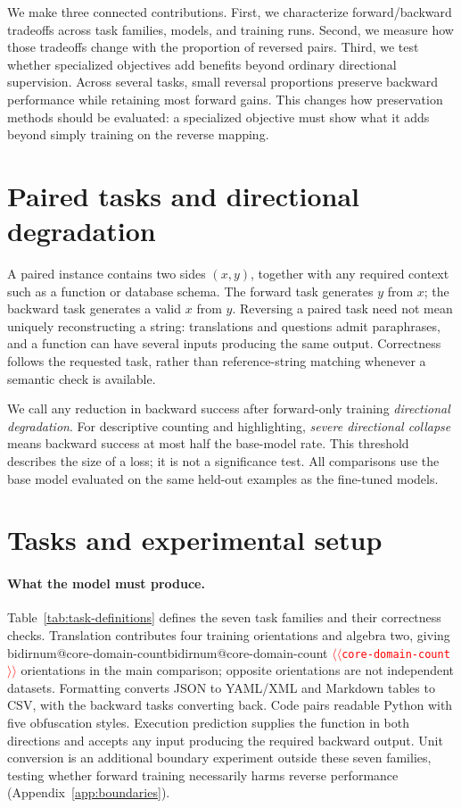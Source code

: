 \documentclass[11pt]{article}
\makeatletter
\providecommand{\NUM}[1]{%
  \ifcsname bidirnum@#1\endcsname\csname bidirnum@#1\endcsname
  \else\textcolor{red}{$\langle\langle$\texttt{#1}$\rangle\rangle$}\fi}
\makeatother
\begin{document}
We make three connected contributions. First, we characterize forward/backward
tradeoffs across task families, models, and training runs. Second, we measure how those
tradeoffs change with the proportion of reversed pairs. Third, we test whether specialized
objectives add benefits beyond ordinary directional supervision. Across several tasks,
small reversal proportions preserve backward performance while retaining most forward
gains. This changes how preservation methods should be evaluated: a specialized objective
must show what it adds beyond simply training on the reverse mapping.

\section{Paired tasks and directional degradation}
\label{sec:defined}

A paired instance contains two sides $(x,y)$, together with any required context such as a
function or database schema. The forward task generates $y$ from $x$; the backward task
generates a valid $x$ from $y$. Reversing a paired task need not mean uniquely reconstructing
a string: translations and questions admit paraphrases, and a function can have several
inputs producing the same output. Correctness follows the requested task, rather than
reference-string matching whenever a semantic check is available.

We call any reduction in backward success after forward-only training \emph{directional
degradation}. For descriptive counting and highlighting, \emph{severe directional collapse}
means backward success at most half the base-model rate. This threshold describes the
size of a loss; it is not a significance test. All comparisons use the base model evaluated
on the same held-out examples as the fine-tuned models.

\section{Tasks and experimental setup}
\label{sec:setup}


\paragraph{What the model must produce.}
Table~\ref{tab:task-definitions} defines the seven task families and their correctness
checks. Translation contributes four training orientations and algebra two, giving
\NUM{core-domain-count} orientations in the main comparison; opposite orientations are
not independent datasets. Formatting converts JSON to YAML/XML and Markdown tables to
CSV, with the backward tasks converting back. Code pairs readable Python with five
obfuscation styles. Execution prediction supplies the function in both directions and
accepts any input producing the required backward output.
Unit conversion is an additional boundary experiment outside these seven families,
testing whether forward training necessarily harms reverse performance
(Appendix~\ref{app:boundaries}).
\end{document}
